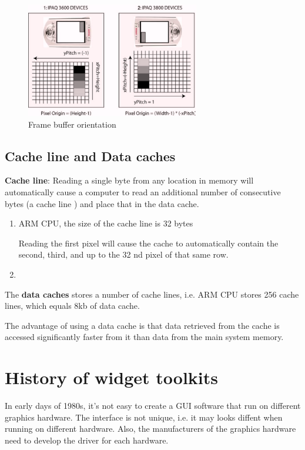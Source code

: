 \begin{figure}[hbt]
  \centerline{\includegraphics[height=5cm,
    angle=0]{./images/framebuffer-orientation.eps}}
\caption{Frame buffer orientation}
\label{fig:framebuffer-orientation}
\end{figure}

\subsection{Cache line and Data caches}

{\bf Cache line}: Reading  a  single  byte  from  any  location  in  memory 
will automatically  cause  a  computer  to  read  an  additional  number  of
consecutive  bytes  (a cache  line )  and  place  that  in  the  data  cache.
\begin{enumerate}
  \item ARM  CPU,  the  size  of  the  
cache line is 32 bytes

Reading  the  first  pixel  will  cause  the cache to automatically contain the
second, third, and up to the 32 nd pixel  of  that  same  row.

 \item 
\end{enumerate}
The {\bf data caches} stores a number of cache lines, i.e.
ARM  CPU  stores  256  cache  lines,  which  equals  
8kb  of  data  cache.

The  advantage  of  using  a  data  cache  is  that  data retrieved  from  the 
cache  is  accessed  significantly  faster  from  it than data from the main
system memory.




\section{History of widget toolkits}
\label{sec:history-widget-toolkits}

In early days of 1980s, it's not easy to create a GUI software that run on
different graphics hardware. The interface is not unique, i.e. it may looks
diffent when running on different hardware. Also, the manufacturers of the
graphics hardware need to develop the driver for each hardware.

